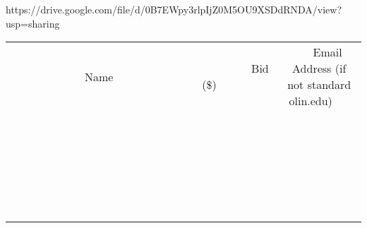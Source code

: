 \documentclass[11pt]{article}
\begin{document}
https://drive.google.com/file/d/0B7EWpy3rlpIjZ0M5OU9XSDdRNDA/view?usp=sharing \\[6ex]
\begin{tabular}{c c c}
~~~~~~~~~~~~~Name~~~~~~~~~~~~~ & ~~~~~~~~~Bid (\$)~~~~~~~~~ & ~~~Email Address (if not standard olin.edu)~~~ \\
 & & \\
\hline
 & & \\
\hline
 & & \\
\hline
 & & \\
\hline
 & & \\
\hline
 & & \\
\hline
 & & \\
\hline
 & & \\
\hline
 & & \\
\hline
 & & \\
\hline
 & & \\
\hline
 & & \\
\hline
 & & \\
\hline
 & & \\
\hline
 & & \\
\hline
 & & \\
\hline
 & & \\
\hline
 & & \\
\hline
 & & \\
\hline
 & & \\
\hline
 & & \\
\hline
 & & \\
\hline
 & & \\
\hline
 & & \\
\hline
 & & \\
\hline
 & & \\
\hline
\end{tabular}
\clearpage
\end{document}

